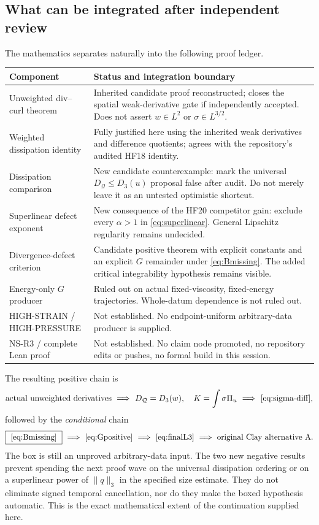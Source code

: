 \documentclass[11pt,a4paper]{article}
\theoremstyle{definition}
\theoremstyle{remark}
\newcommand{\Q}{\mathcal Q}
\newcommand{\norm}[1]{\lVert #1\rVert}
\numberwithin{equation}{section}
\begin{document}
\subsection{What can be integrated after independent review}
The mathematics separates naturally into the following proof ledger.
\begin{center}
\begin{tabular}{@{}p{59mm}p{96mm}@{}}
\toprule
Component & Status and integration boundary\\
\midrule
Unweighted div--curl theorem & Inherited candidate proof reconstructed; closes the spatial weak-derivative gate if independently accepted. Does not assert \(w\in L^2\) or \(\sigma\in L^{3/2}\).\\[3pt]
Weighted dissipation identity & Fully justified here using the inherited weak derivatives and difference quotients; agrees with the repository's audited HF18 identity.\\[3pt]
Dissipation comparison & New candidate counterexample: mark the universal \(D_{\Q}\le D_3(u)\) proposal false after audit. Do not merely leave it as an untested optimistic shortcut.\\[3pt]
Superlinear defect exponent & New consequence of the HF20 competitor gain: exclude every \(\alpha>1\) in \eqref{eq:superlinear}. General Lipschitz regularity remains undecided.\\[3pt]
Divergence-defect criterion & Candidate positive theorem with explicit constants and an explicit \(G\) remainder under \eqref{eq:Bmissing}. The added critical integrability hypothesis remains visible.\\[3pt]
Energy-only \(G\) producer & Ruled out on actual fixed-viscosity, fixed-energy trajectories. Whole-datum dependence is not ruled out.\\[3pt]
\raggedright HIGH-STRAIN / HIGH-PRESSURE & Not established. No endpoint-uniform arbitrary-data producer is supplied.\\[3pt]
NS-R3 / complete Lean proof & Not established. No claim node promoted, no repository edits or pushes, no formal build in this session.\\
\bottomrule
\end{tabular}
\end{center}

The resulting positive chain is
\[
\text{actual unweighted derivatives}
\ \Longrightarrow\ D_{\Q}=D_3(w),\quad K=\int\sigma\Pi_u
\ \Longrightarrow\ \eqref{eq:sigma-diff},
\]
followed by the \emph{conditional} chain
\[
\boxed{\ \eqref{eq:Bmissing}\ }\ \Longrightarrow\ \eqref{eq:Gpositive}
\ \Longrightarrow\ \eqref{eq:finalL3}
\ \Longrightarrow\ \text{original Clay alternative A}.
\]
The box is still an unproved arbitrary-data input. The two new negative results prevent spending the next proof wave on the universal dissipation ordering or on a superlinear power of \(\norm q_3\) in the specified size estimate. They do not eliminate signed temporal cancellation, nor do they make the boxed hypothesis automatic. This is the exact mathematical extent of the continuation supplied here.
\end{document}
